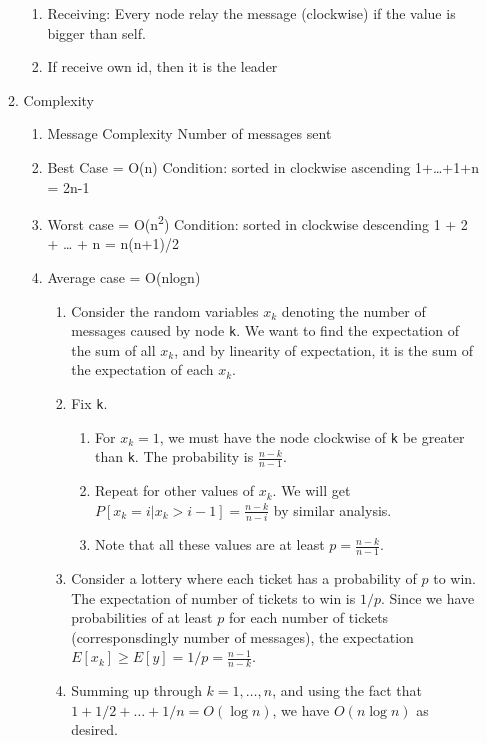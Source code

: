 \documentclass[11pt]{article}
\begin{document}
\begin{enumerate}
\begin{enumerate}
\begin{enumerate}
\item Receiving: Every node relay the message (clockwise) if the value is bigger
than self.
\item If receive own id, then it is the leader
\end{enumerate}
\item Complexity
\label{sec:orga4f9304}
\begin{enumerate}
\item Message Complexity
\label{sec:org00f3399}
Number of messages sent
\item Best Case = O(n)
\label{sec:org0229c3c}
Condition: sorted in clockwise ascending
1+\ldots{}+1+n = 2n-1
\item Worst case = O(n\textsuperscript{2})
\label{sec:org318a1e9}
Condition: sorted in clockwise descending
1 + 2 + \ldots{} + n = n(n+1)/2
\item Average case = O(nlogn)
\label{sec:orgf38b73c}
\begin{enumerate}
\item Consider the random variables \(x_k\) denoting the number of messages caused by
node \texttt{k}. We want to find the expectation of the sum of all \(x_k\), and by
linearity of expectation, it is the sum of the expectation of each \(x_k\).
\item Fix \texttt{k}.
\begin{enumerate}
\item For \(x_k=1\), we must have the node clockwise of \texttt{k} be greater than \texttt{k}. The probability is \(\frac{n-k}{n-1}\).
\item Repeat for other values of \(x_k\). We will get
\(P[x_k=i|x_k>i-1]=\frac{n-k}{n-i}\) by similar analysis.
\item Note that all these values are at least \(p=\frac{n-k}{n-1}\).
\end{enumerate}
\item Consider a lottery where each ticket has a probability of \(p\) to win. The
expectation of number of tickets to win is \(1/p\). Since we have probabilities of at
least \(p\) for each number of tickets (corresponsdingly number of messages),
the expectation \(E[x_k]\ge E[y] = 1/p =\frac{n-1}{n-k}\).
\item Summing up through \(k=1,\ldots,n\), and using the fact that
\(1+1/2+\ldots+1/n=O(\log n)\), we have \(O(n\log n)\) as desired.
\end{enumerate}
\end{enumerate}
\end{enumerate}
\end{enumerate}
\end{document}
